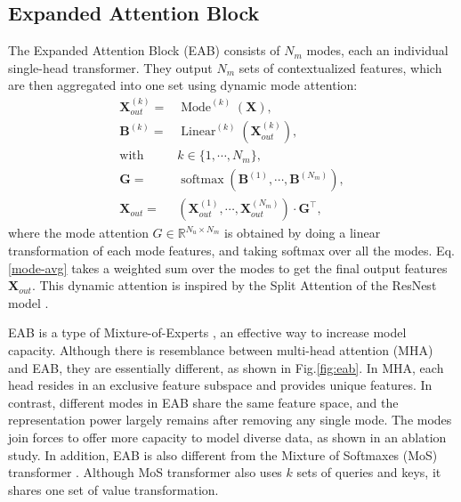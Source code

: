 \documentclass{article}
\begin{document}
\subsection{Expanded Attention Block}
The Expanded Attention Block (EAB) consists of $N_m$ modes, each an individual single-head transformer. They output $N_m$ sets of contextualized features, which are then aggregated into one set using dynamic mode attention:
\begin{align}
\boldsymbol{X}_{out}^{(k)} =& \operatorname{Mode}^{(k)}(\boldsymbol{X}), \\
\boldsymbol{B}^{(k)} =& \operatorname{Linear}^{(k)}(\boldsymbol{X}_{out}^{(k)}), \label{mode-attn} \\
\text{with } &k \in \{1,\cdots,N_m\}, \nonumber \\
\boldsymbol{G} =& \operatorname{softmax}\left(\boldsymbol{B}^{(1)}, \cdots, \boldsymbol{B}^{(N_m)}\right), \label{mode-attn-softmax} \\
\boldsymbol{X}_{out} =& \left(\boldsymbol{X}_{out}^{(1)}, \cdots, \boldsymbol{X}_{out}^{(N_m)} \right) \cdot \boldsymbol{G}^\top, \label{mode-avg}
\end{align}
where the mode attention $G \in \mathbb{R}^{N_u \times N_m}$ is obtained by doing a linear transformation of each mode features, and taking softmax over all the modes. Eq.\eqref{mode-avg} takes a weighted sum over the modes to get the final output features $\boldsymbol{X}_{out}$. This dynamic attention is inspired by the Split Attention of the ResNest model \cite{resnest}.

EAB is a type of Mixture-of-Experts \cite{sparse-moe}, an effective way to increase model capacity. Although there is resemblance between multi-head attention (MHA) and EAB, they are essentially different, as shown in Fig.\ref{fig:eab}. In MHA, each head resides in an exclusive feature subspace and provides unique features. In contrast, different modes in EAB share the same feature space, and the representation power largely remains after removing any single mode. The modes join forces to offer more capacity to model diverse data, as shown in an ablation study. In addition, EAB is also different from the  Mixture of Softmaxes (MoS) transformer \cite{fpt}. Although MoS transformer also uses $k$ sets of queries and keys, it shares one set of value transformation.
\end{document}
